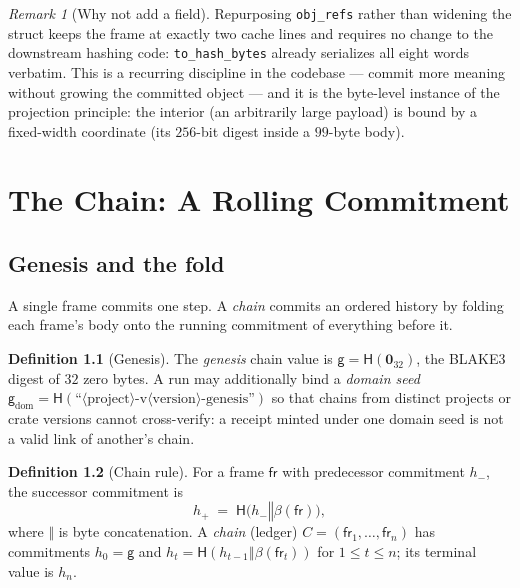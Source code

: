 \documentclass[11pt,oneside]{book}
\theoremstyle{definition}
\newtheorem{definition}{Definition}[chapter]
\theoremstyle{plain}
\theoremstyle{remark}
\newtheorem*{remark}{Remark}
\newcommand{\chainH}{\mathsf{H}}               %
\newcommand{\fr}{\mathsf{fr}}                   %
\newcommand{\body}{\beta}                       %
\newcommand{\code}[1]{\texttt{#1}}
\newcommand{\concat}{\mathbin{\Vert}}           %
\newcommand{\Genesis}{\mathsf{g}}               %
\newcommand{\Ledger}{C}               %
\begin{document}
\begin{remark}[Why not add a field]
Repurposing \code{obj\_refs} rather than widening the struct keeps the frame at exactly two
cache lines and requires no change to the downstream hashing code: \code{to\_hash\_bytes}
already serializes all eight words verbatim. %
This is a recurring discipline in the codebase
--- commit more meaning without growing the committed object --- and it is the byte-level
instance of the projection principle: the interior (an arbitrarily large payload) is bound by
a fixed-width coordinate (its $256$-bit digest inside a $99$-byte body). %
\end{remark}

\chapter{The Chain: A Rolling Commitment}
\label{ch:chain}

\section{Genesis and the fold}

A single frame commits one step. %
A \emph{chain} commits an ordered history by folding each
frame's body onto the running commitment of everything before it. %

\begin{definition}[Genesis]\label{def:genesis}
The \emph{genesis} chain value is $\Genesis=\chainH(\bm 0_{32})$, the BLAKE3 digest of $32$
zero bytes. %
A run may additionally bind a \emph{domain seed}
$\Genesis_{\mathrm{dom}}=\chainH(\text{``}\langle\text{project}\rangle\text{-v}\langle
\text{version}\rangle\text{-genesis''})$ so that chains from distinct projects or crate
versions cannot cross-verify: a receipt minted under one domain seed is not a valid link of
another's chain. %
\end{definition}

\begin{definition}[Chain rule]\label{def:chain}
For a frame $\fr$ with predecessor commitment $h_{-}$, the successor commitment is %
\begin{equation}\label{eq:chain}
h_{+} \;=\; \chainH\bigl(h_{-}\concat\body(\fr)\bigr),
\end{equation}
where $\concat$ is byte concatenation. %
A \emph{chain} (ledger) $\Ledger=(\fr_1,\dots,\fr_n)$
has commitments $h_0=\Genesis$ and $h_t=\chainH(h_{t-1}\concat\body(\fr_t))$ for
$1\le t\le n$; its terminal value is $h_n$. %
\end{definition}
\end{document}

